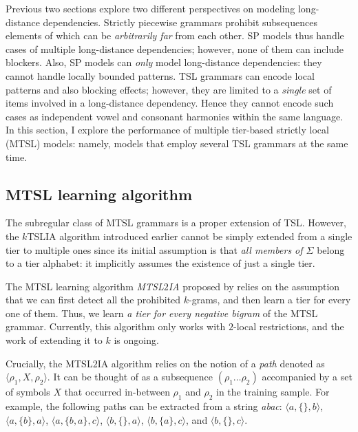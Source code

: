 Previous two sections explore two different perspectives on modeling long-distance dependencies.
Strictly piecewise grammars prohibit subsequences elements of which can be \emph{arbitrarily far} from each other.
SP models thus handle cases of multiple long-distance dependencies; however, none of them can include blockers.
Also, SP models can \emph{only} model long-distance dependencies: they cannot handle locally bounded patterns.
TSL grammars can encode local patterns and also blocking effects; however, they are limited to a \emph{single} set of items involved in a long-distance dependency.
Hence they cannot encode such cases as independent vowel and consonant harmonies within the same language.
In this section, I explore the performance of multiple tier-based strictly local (MTSL) models: namely, models that employ several TSL grammars at the same time.



\subsection{MTSL learning algorithm}
\label{mtsllearner}

The subregular class of MTSL grammars is a proper extension of TSL.
However, the $k$TSLIA algorithm introduced earlier cannot be simply extended from a single tier to multiple ones since its initial assumption is that \emph{all members of $\Sigma$} belong to a tier alphabet: it implicitly assumes the existence of just a single tier.

The MTSL learning algorithm \emph{MTSL$2$IA} proposed by \citet{McMullinAksenovaDeSanto2019} relies on the assumption that we can first detect all the prohibited $k$-grams, and then learn a tier for every one of them.
Thus, we learn \emph{a tier for every negative bigram} of the MTSL grammar.
Currently, this algorithm only works with $2$-local restrictions, and the work of extending it to $k$ is ongoing.

Crucially, the MTSL$2$IA algorithm relies on the notion of a \emph{path} denoted as $\langle\rho_1, X, \rho_2\rangle$.
It can be thought of as a subsequence $(\rho_1\dots\rho_2)$ accompanied by a set of symbols $X$ that occurred in-between $\rho_1$ and $\rho_2$ in the training sample. For example, the following paths can be extracted from a string \emph{abac}:
$\langle a, \{\}, b \rangle$,
$\langle a, \{b\}, a \rangle$,
$\langle a, \{b, a\}, c \rangle$,
$\langle b, \{\}, a \rangle$,
$\langle b, \{a\}, c \rangle$, and 
$\langle b, \{\}, c \rangle$.


